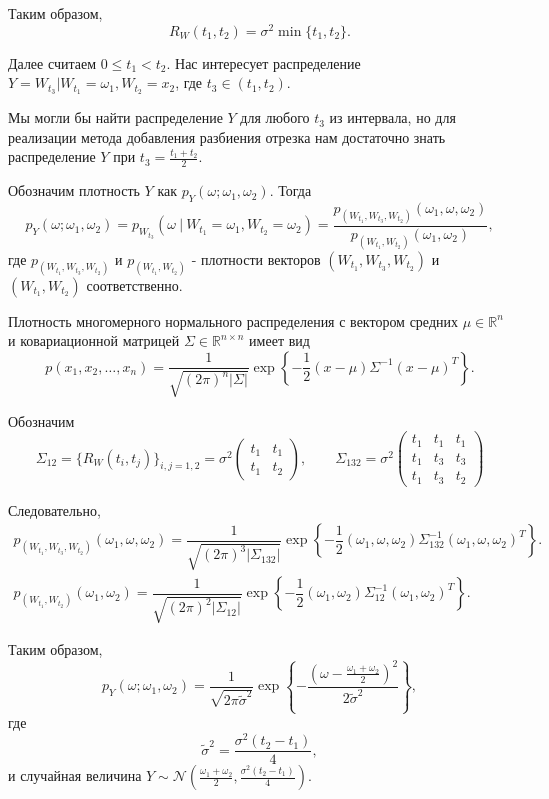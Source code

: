 \documentclass[11pt]{report}
\begin{document}
Таким образом,
$$
R_W(t_1,t_2) = \sigma^2 \min\{ t_1,t_2 \}.
$$

Далее считаем $0\leqslant t_1<t_2$. Нас интересует распределение $Y = W_{t_3}|W_{t_1}=\omega_1,W_{t_2}=x_2$, где $t_3\in(t_1,t_2)$.

Мы могли бы найти распределение $Y$ для любого $t_3$ из интервала, но для реализации метода добавления разбиения отрезка нам достаточно знать распределение $Y$ при $t_3 = \frac{t_1+t_2}{2}$.

Обозначим плотность $Y$ как $p_Y(\omega;\omega_1,\omega_2)$. Тогда
$$
p_Y(\omega;\omega_1,\omega_2) = p_{W_{t_3}}(\omega~|~W_{t_1}=\omega_1,W_{t_2}=\omega_2) = \dfrac{p_{(W_{t_1},W_{t_3},W_{t_2})}(\omega_1,\omega,\omega_2)}{p_{(W_{t_1},W_{t_2})}(\omega_1,\omega_2)},
$$
где $p_{(W_{t_1},W_{t_3},W_{t_2})}$ и $p_{(W_{t_1},W_{t_2})}$ - плотности векторов $(W_{t_1},W_{t_3},W_{t_2})$ и $(W_{t_1},W_{t_2})$ соответственно.

Плотность многомерного нормального распределения с вектором средних $\mu\in\mathbb{R}^n$ и ковариационной матрицей $\Sigma\in\mathbb{R}^{n\times n}$ имеет вид
$$
p(x_1,x_2,\dots,x_n) = \dfrac{1}{\sqrt{(2\pi)^n|\Sigma|}}\exp\left\{ -\dfrac{1}{2}(x-\mu)\Sigma^{-1}(x-\mu)^T \right\}.
$$

Обозначим
$$
\Sigma_{12} = \{R_W(t_i,t_j) \}_{i,j=1,2} = \sigma^2\begin{pmatrix}
t_1 & t_1 \\
t_1 & t_2
\end{pmatrix}, \qquad
\Sigma_{132} = \sigma^2\begin{pmatrix}
t_1 & t_1 & t_1 \\
t_1 & t_3 & t_3 \\
t_1 & t_3 & t_2
\end{pmatrix}
$$

Следовательно,
\begin{gather*}
p_{(W_{t_1},W_{t_3},W_{t_2})}(\omega_1,\omega,\omega_2) = \dfrac{1}{\sqrt{(2\pi)^3|\Sigma_{132}|}}
\exp\left\{ -\dfrac{1}{2} (\omega_1,\omega,\omega_2)\Sigma_{132}^{-1}(\omega_1,\omega,\omega_2)^T \right\}. \\
p_{(W_{t_1},W_{t_2})}(\omega_1,\omega_2) = \dfrac{1}{\sqrt{(2\pi)^2|\Sigma_{12}|}}
\exp\left\{ -\dfrac{1}{2}(\omega_1,\omega_2)\Sigma_{12}^{-1}(\omega_1,\omega_2)^T \right\}.
\end{gather*}

Таким образом,
$$
p_Y(\omega;\omega_1,\omega_2) = \dfrac{1}{\sqrt{2\pi\widetilde\sigma^2}}\exp\left\{ -\dfrac{(\omega-\frac{\omega_1+\omega_2}{2})^2}{2\widetilde\sigma^2} \right\},
$$
где
$$
\widetilde\sigma^2 = \frac{\sigma^2(t_2-t_1)}{4},
$$
и случайная величина $Y\sim\mathcal{N}(\frac{\omega_1+\omega_2}{2},\frac{\sigma^2(t_2-t_1)}{4})$.
\end{document}
